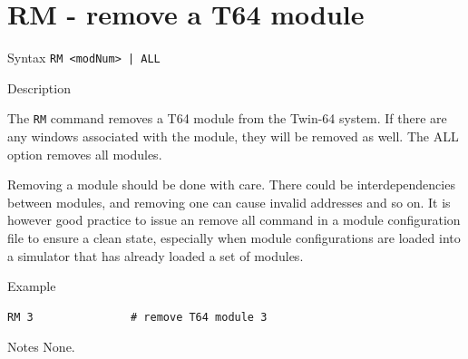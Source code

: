 %
%
\pagebreak
\section*{RM - remove a T64 module}

\begin{iPageDescEntry}{Syntax}
\texttt{RM <modNum> | ALL} \\
\end{iPageDescEntry}

\begin{iPageDescEntry}{Description}

The \texttt{RM} command removes a T64 module from the Twin-64 system. If there are any windows associated with the module, they will be removed as well. The ALL option removes all modules.

Removing a module should be done with care. There could be interdependencies between modules, and removing one can cause invalid addresses and so on. It is however good practice to issue an remove all command in a module configuration file to ensure a clean state, especially when module configurations are loaded into a simulator that has already loaded a set of modules. 

\end{iPageDescEntry}

\begin{iPageDescOpEntry}{Example}

\begin{lstlisting}[style=iPageOpStyle]
RM 3               # remove T64 module 3
\end{lstlisting}
\end{iPageDescOpEntry}

\begin{iPageDescEntry}{Notes}
None.
\end{iPageDescEntry}
